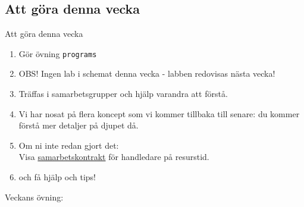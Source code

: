 \ifkompendium\else

\subsection{Att göra denna vecka}
\begin{SlideExtra}{Att göra denna vecka}

\begin{enumerate}
\item Gör övning \texttt{programs}
\item OBS! Ingen lab i schemat denna vecka - labben redovisas nästa vecka!
\item Träffas i samarbetsgrupper och hjälp varandra att förstå.
\item Vi har nosat på flera koncept som vi kommer tillbaka till senare: du kommer förstå mer detaljer på djupet då.
\item Om ni inte redan gjort det: \\Visa \href{https://github.com/bjornregnell/lth-eda016-2015/tree/master/assignments}{samarbetskontrakt} för handledare på resurstid.
\item {} och få hjälp och tips!
\end{enumerate}
\end{SlideExtra}

\begin{SlideExtra}{Veckans övning: \texttt{\ExeWeekTWO}}\SlideFontTiny
\vspace{-0.5em}
\setlength{\leftmargini}{0pt}
\begin{itemize}

\end{itemize}
\end{SlideExtra}


